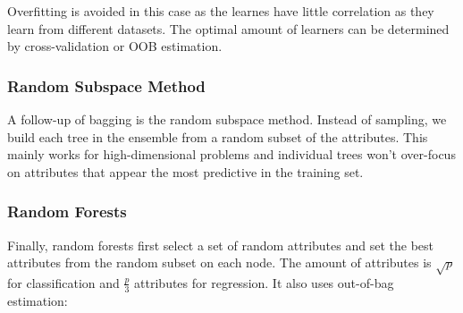 Overfitting is avoided in this case as the learnes have little
correlation as they learn from different datasets. The optimal
amount of learners can be determined by cross-validation or OOB 
estimation.

\subsubsection{Random Subspace Method}

A follow-up of bagging is the random subspace method. Instead of
sampling, we build each tree in the ensemble from a random subset of
the attributes. This mainly works for high-dimensional problems and
individual trees won't over-focus on attributes that appear the most
predictive in the training set.

\subsubsection{Random Forests}

Finally, random forests first select a set of random attributes and
set the best attributes from the random subset on each node. The amount
of attributes is $\sqrt{p}$ for classification and $\frac{p}{3}$ attributes
for regression. It also uses out-of-bag estimation:

  \begin{definition}
    
  \end{definition}
